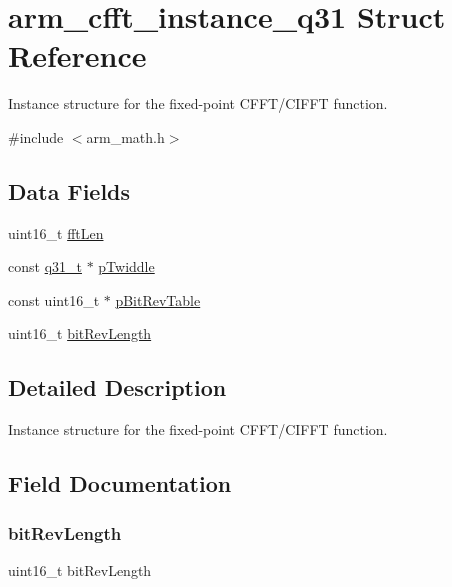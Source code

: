 \hypertarget{structarm__cfft__instance__q31}{}\section{arm\+\_\+cfft\+\_\+instance\+\_\+q31 Struct Reference}
\label{structarm__cfft__instance__q31}


Instance structure for the fixed-\/point C\+F\+F\+T/\+C\+I\+F\+FT function.  




{\ttfamily \#include $<$arm\+\_\+math.\+h$>$}

\subsection*{Data Fields}
\begin{DoxyCompactItemize}
\item 
uint16\+\_\+t \mbox{\hyperlink{structarm__cfft__instance__q31_ab8db3bbe7c61e6bb8ca2a55e3446e11a}{fft\+Len}}
\item 
const \mbox{\hyperlink{arm__math_8h_adc89a3547f5324b7b3b95adec3806bc0}{q31\+\_\+t}} $\ast$ \mbox{\hyperlink{structarm__cfft__instance__q31_a9760c603af5d85652496dbffd63a8a2e}{p\+Twiddle}}
\item 
const uint16\+\_\+t $\ast$ \mbox{\hyperlink{structarm__cfft__instance__q31_a3b229432d381b0a511a9cdbe3aa74e78}{p\+Bit\+Rev\+Table}}
\item 
uint16\+\_\+t \mbox{\hyperlink{structarm__cfft__instance__q31_a65e1b3e327b8fab9404287ed8f347cc8}{bit\+Rev\+Length}}
\end{DoxyCompactItemize}


\subsection{Detailed Description}
Instance structure for the fixed-\/point C\+F\+F\+T/\+C\+I\+F\+FT function. 

\subsection{Field Documentation}
\mbox{\label{structarm__cfft__instance__q31_a65e1b3e327b8fab9404287ed8f347cc8}} 
\subsubsection{\texorpdfstring{bitRevLength}{bitRevLength}}
{\footnotesize\ttfamily uint16\+\_\+t bit\+Rev\+Length}

